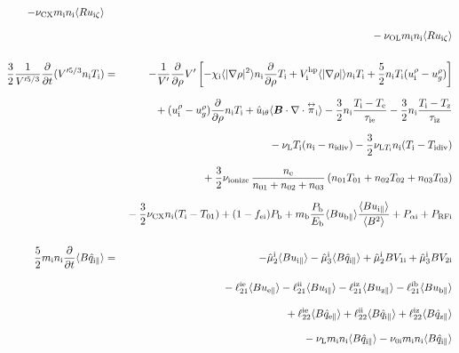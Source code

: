 \documentclass[11pt]{article}
\def\bvec#1{\leavevmode\hbox{\boldmath$#1$}}
\let\vec=\bvec
\def\r#1{{\rm#1}}
\def\aves#1{\langle#1\rangle}
\def\tensor#1{\mathord{\displaystyle\mathop{#1}^\leftrightarrow}}
\def\para{\parallel}
\def\ddrho{\frac{\partial}{\partial\rho}}
\def\ddt{\frac{\partial}{\partial t}}
\def\mi{m_\r{i}}
\def\mb{m_\r{b}}
\def\nee{n_\r{e}}
\def\ni{n_\r{i}}
\def\Te{T_\r{e}}
\def\Ti{T_\r{i}}
\def\Tz{T_\r{z}}
\def\uzt#1{u_{\r{#1}\zeta}}
\def\upara#1{u_{\r{#1}\para}}
\def\uhatth#1{\hat{u}_{\r{#1}\theta}}
\def\qhatpara#1{\hat{q}_{\r{#1}\para}}
\def\urho#1{u_\r{#1}^\rho}
\def\ugrho{u_{g}^\rho}
\def\chis#1{\chi_\r{#1}}
\def\nun#1{\nu_\r{0#1}}
\def\ndiv#1{n_\r{#1div}}
\def\Tdiv#1{T_\r{#1div}}
\def\nuLT#1{\nu_{\r{L}T_\r{#1}}}
\def\PRF#1{P_\r{RF#1}}
\def\Palp#1{P_{\alpha\r{#1}}}
\def\fei{f_\r{ei}}
\def\Pb{P_\r{b}}
\def\Eb{E_\r{b}}
\def\nna{n_{01}}
\def\nnb{n_{02}}
\def\nnc{n_{03}}
\def\Tna{T_{01}}
\def\Tnb{T_{02}}
\def\Tnc{T_{03}}
\def\nuL{\nu_\r{L}}
\def\nuCX{\nu_\r{CX}}
\def\nuion{\nu_\r{ionize}}
\def\nuOL{\nu_\r{OL}}
\begin{document}
\begin{eqnarray}
%
  - \nuCX \mi \ni \aves{R \uzt{i}}
\nonumber\\[2.5mm]&&{}
%
  - \nuOL \mi \ni \aves{R \uzt{i}}
\\[5mm]
 \frac{3}{2}\frac{1}{V'^{5/3}} \ddt (V'^{5/3} \ni \Ti ) &=& 
%
  - \frac{1}{V'} \ddrho V'
    \left[ - \chis{i}          \aves{|\nabla\rho|^2} \ni \ddrho \Ti
           + V_\r{i}^\r{hp} \aves{|\nabla\rho|}   \ni \Ti
           + \frac{5}{2} \ni \Ti ( \urho{i} - \ugrho ) \right]
\nonumber\\[2.5mm]&&{}
%
  + ( \urho{i} - \ugrho ) \ddrho \ni \Ti
%
  + \uhatth{i} \aves{\vec{B}\cdot\nabla\cdot\tensor{\pi}_\r{i}}
%
  - \frac{3}{2} \ni \frac{ \Ti - \Te }{\tau_\r{ie}}
  - \frac{3}{2} \ni \frac{ \Ti - \Tz }{\tau_\r{iz}}
\nonumber\\[2.5mm]&&{}
%
  - \nuL \Ti (\ni - \ndiv{i})
%
  - \frac{3}{2} \nuLT{i} \ni (\Ti - \Tdiv{i})
%
\nonumber\\[2.5mm]&&{}
  + \frac{3}{2} \nuion\, \frac{\nee}{\nna + \nnb + \nnc}\, (\nna \Tna +
  \nnb \Tnb + \nnc \Tnc)
\nonumber\\[2.5mm]&&{}
%
  - \frac{3}{2} \nuCX \ni (\Ti - \Tna)
%
  + (1 - \fei) \Pb
%
  + \mb \frac{\Pb}{\Eb} \aves{B \upara{b}} \frac{\aves{B \upara{i}}}{\aves{B^2}}
%
  + \Palp{i}
%
  + \PRF{i}
\\[5mm]
 \frac{5}{2} \mi \ni \ddt \aves{B \qhatpara{i}} &=&
%
  - \hat{\mu}_2^\r{i} \aves{B \upara{i}} 
  - \hat{\mu}_3^\r{i} \aves{B \qhatpara{i}}
%
  + \hat{\mu}_2^\r{i} {B V_{1\r{i}}} 
  + \hat{\mu}_3^\r{i} {B V_{2\r{i}}}
\nonumber\\[3mm]&&{}
%
  - \ell_{21}^{\r{ie}} \aves{B \upara{e}}
  - \ell_{21}^{\r{ii}} \aves{B \upara{i}}
  - \ell_{21}^{\r{iz}} \aves{B \upara{z}}
  - \ell_{21}^{\r{ib}} \aves{B \upara{b}}
\nonumber\\[3mm]&&{}
%
  + \ell_{22}^{\r{ie}} \aves{B \qhatpara{e}}
  + \ell_{22}^{\r{ii}} \aves{B \qhatpara{i}}
  + \ell_{22}^{\r{iz}} \aves{B \qhatpara{z}}
\nonumber\\[3mm]&&{}
%
  - \nuL \mi \ni \aves{B \qhatpara{i}}
%
  - \nun{i} \mi \ni \aves{B \qhatpara{i}}
\end{eqnarray}
%
\end{document}
